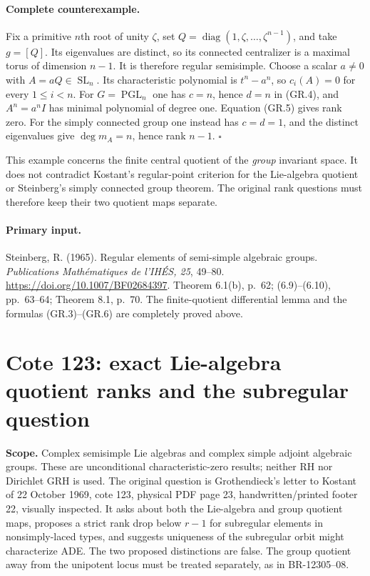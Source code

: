 \documentclass[11pt,a4paper]{article}
\theoremstyle{definition}\newtheorem{definition}[theorem]{Definition}
\theoremstyle{remark}\newtheorem{remark}[theorem]{Remark}
\begin{document}
\paragraph{Complete counterexample.}
Fix a primitive $n$th root of unity $\zeta$, set
$Q=\operatorname{diag}(1,\zeta,\ldots,\zeta^{n-1})$, and
take $g=[Q]$.  Its eigenvalues are distinct, so its connected
centralizer is a maximal torus of dimension $n-1$.  It is
therefore regular semisimple.  Choose a scalar $a\ne0$ with
$A=aQ\in\operatorname{SL}_n$.  Its characteristic polynomial
is $t^n-a^n$, so $c_i(A)=0$ for every $1\leq i<n$.
For $G=\operatorname{PGL}_n$ one has $c=n$, hence $d=n$ in
(GR.4), and $A^n=a^n I$ has minimal polynomial of degree one.
Equation (GR.5) gives rank zero.  For the simply connected
group one instead has $c=d=1$, and the distinct eigenvalues
give $\deg m_A=n$, hence rank $n-1$.
\(\square\)

This example concerns the finite central quotient of the
\emph{group} invariant space.  It does not contradict Kostant's
regular-point criterion for the Lie-algebra quotient or Steinberg's
simply connected group theorem.  The original rank questions
must therefore keep their two quotient maps separate.

\paragraph{Primary input.}
Steinberg, R. (1965). Regular elements of semi-simple algebraic
groups. \emph{Publications Math\'ematiques de l'IH\'ES, 25},
49--80. \url{https://doi.org/10.1007/BF02684397}.
Theorem 6.1(b), p.~62; (6.9)--(6.10), pp.~63--64;
Theorem 8.1, p.~70. The finite-quotient differential lemma and
the formulas (GR.3)--(GR.6) are completely proved above.


\section{Cote 123: exact Lie-algebra quotient ranks and the subregular question}\label{cote-123-exact-lie-algebra-quotient-ranks-and-the-subregular-question}

\textbf{Scope.} Complex semisimple Lie algebras and complex simple adjoint algebraic groups. These are unconditional characteristic-zero results; neither RH nor Dirichlet GRH is used. The original question is Grothendieck's letter to Kostant of 22 October 1969, cote 123, physical PDF page 23, handwritten/printed footer 22, visually inspected. It asks about both the Lie-algebra and group quotient maps, proposes a strict rank drop below \(r-1\) for subregular elements in nonsimply-laced types, and suggests uniqueness of the subregular orbit might characterize ADE. The two proposed distinctions are false. The group quotient away from the unipotent locus must be treated separately, as in BR-12305--08.
\end{document}
